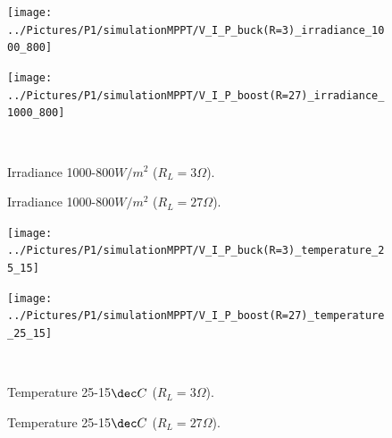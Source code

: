 \begin{figure}[H]
	\begin{minipage}[c]{0.6\textwidth}
		\centering
		\texttt{[image: ../Pictures/P1/simulationMPPT/V\_I\_P\_buck(R=3)\_irradiance\_1000\_800]} %
	\end{minipage}%
	\hfill
	\begin{minipage}[c]{0.6\textwidth}
		\centering
		\texttt{[image: ../Pictures/P1/simulationMPPT/V\_I\_P\_boost(R=27)\_irradiance\_1000\_800]} %
	\end{minipage} \\ %
	\begin{minipage}[t]{0.6\textwidth}
		\caption{Irradiance 1000-800$W/ m^2$ ($R_{L}=3\Omega$).} %
		\label{buckirradiance}
	\end{minipage}%
	\hfill
	\begin{minipage}[t]{0.6\textwidth}
		\caption{Irradiance 1000-800$W/ m^2$ ($R_{L}=27\Omega$).} %
		\label{boostirradiance}
	\end{minipage}
\end{figure}



\vspace{1cm}
\begin{figure}[H]
	\begin{minipage}[c]{0.6\textwidth}
		\centering
		\texttt{[image: ../Pictures/P1/simulationMPPT/V\_I\_P\_buck(R=3)\_temperature\_25\_15]} %
	\end{minipage}%
	\hfill
	\begin{minipage}[c]{0.6\textwidth}
		\centering
		\texttt{[image: ../Pictures/P1/simulationMPPT/V\_I\_P\_boost(R=27)\_temperature\_25\_15]} %
	\end{minipage} \\ %
	\begin{minipage}[t]{0.6\textwidth}
		\caption{Temperature 25-15$\dec C$ ($R_{L}=3\Omega$).} %
		\label{bucktemperature}
	\end{minipage}%
	\hfill
	\begin{minipage}[t]{0.6\textwidth}
		\caption{Temperature 25-15$\dec C$ ($R_{L}=27\Omega$).} %
		\label{boosttemperature}
	\end{minipage}
\end{figure}


